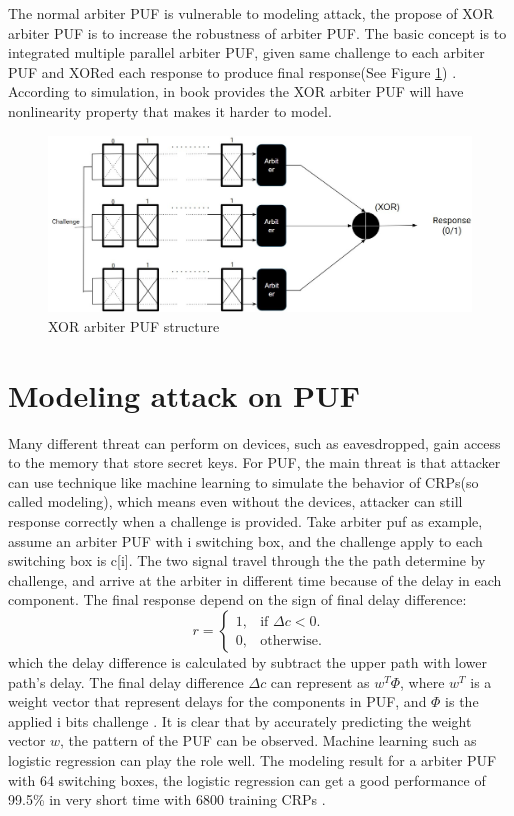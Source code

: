 The normal arbiter PUF is vulnerable to modeling attack, the propose of XOR arbiter PUF is to increase the robustness of arbiter PUF. The basic concept is to integrated multiple parallel arbiter PUF, given same challenge to each arbiter PUF and XORed each response to produce final response(See Figure \ref{fig:figure7}) \cite{Reference5}.
According to simulation, in book \cite{Reference4} provides the XOR arbiter PUF will have nonlinearity property that makes it harder to model.

\begin{figure}[htp]
    \centering
    \includegraphics[width=12cm]{figures/figure7.jpg}
    \caption{XOR arbiter PUF structure}
    \label{fig:figure7}
    \end{figure}

\section{Modeling attack on PUF}
Many different threat can perform on devices, such as eavesdropped, gain access to the memory that store secret keys. For PUF, the main threat is that attacker can use technique 
like machine learning to simulate the behavior of CRPs(so called modeling), which means even without the devices, attacker can still response correctly when a challenge is 
provided. Take arbiter puf as example, assume an arbiter PUF with i switching box, and the challenge apply to each switching box is c[i]. The two signal travel through the 
the path determine by challenge, and arrive at the arbiter in different time because of the delay in each component. The final response depend on the sign of final delay 
difference:
\begin{equation}
    r =\begin{cases}
    1, & \text{if $\Delta c<0$}.\\
    0, & \text{otherwise}.
    \end{cases}
\end{equation}
which the delay difference is calculated by subtract the upper path with lower path's delay. The final delay difference $\Delta c$ can represent as $w^{T}\Phi$, where $w^{T}$ is 
a weight vector that represent delays for the components in PUF, and $\Phi$ is the applied i bits challenge \cite{Reference5}. It is clear that by accurately predicting the weight vector $w$,
the pattern of the PUF can be observed. Machine learning such as logistic regression can play the role well. The modeling result for a arbiter PUF with 64 switching boxes, 
the logistic regression can get a good performance of 99.5\% in very short time with 6800 training CRPs \cite{Reference5}.

